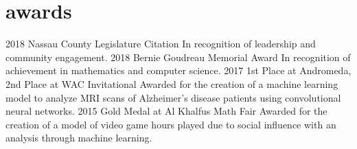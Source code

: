 \documentclass[]{friggeri-cv}
\begin{document}
\section{awards}
    \begin{entrylist}
        \entry
            {2018}
            {Nassau County Legislature Citation}
            {}
            {In recognition of leadership and community engagement.} 
        \entry
            {2018}
            {Bernie Goudreau Memorial Award}
            {}
            {In recognition of achievement in mathematics and computer science.}
        \entry
            {2017}
            {1st Place at Andromeda, 2nd Place at WAC Invitational}
            {}
            {Awarded for the creation of a machine learning model to analyze MRI scans of Alzheimer’s disease patients using convolutional neural networks.}
        \entry
            {2015}
            {Gold Medal at Al Khalfus Math Fair}
            {}
            {Awarded for the creation of a
            model of video game hours played due to social influence with an analysis through machine learning.}
    \end{entrylist}
\end{document}
